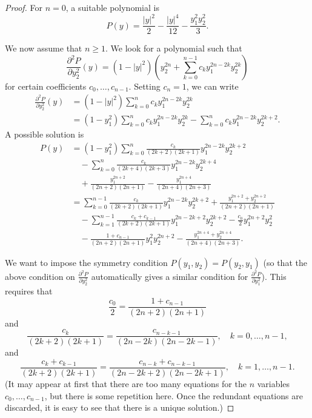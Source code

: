 \documentclass[a4paper]{article}
\theoremstyle{definition}
\theoremstyle{remark}
\begin{document}
\begin{proof}
For $n = 0$, a suitable polynomial is
\[
P(y) = \frac{|y|^2}{2} - \frac{|y|^4}{12} - \frac{y_1^2 y_2^2}{3}.
\]

We now assume that $n \ge 1$. We look for a polynomial such that
\[
\frac{\partial^2 P}{\partial y_2^2}(y) = (1 - |y|^2) \left(y_2^{2n} + \sum_{k = 0}^{n - 1} c_k y_1^{2n - 2k} y_2^{2k}\right)
\]
for certain coefficients $c_0, \dotsc, c_{n - 1}$. Setting $c_n = 1$, we
can write
\[
\begin{split}
\frac{\partial^2 P}{\partial y_2^2}(y) & = (1 - |y|^2) \sum_{k = 0}^n c_k y_1^{2n - 2k} y_2^{2k} \\
& = (1 - y_1^2) \sum_{k = 0}^n c_k y_1^{2n - 2k} y_2^{2k} - \sum_{k = 0}^n c_k y_1^{2n - 2k} y_2^{2k + 2}.
\end{split}
\]
A possible solution is
\[
\begin{split}
P(y) & = (1 - y_1^2) \sum_{k = 0}^n \frac{c_k}{(2k + 2)(2k + 1)} y_1^{2n - 2k} y_2^{2k + 2} \\
& \quad - \sum_{k = 0}^n \frac{c_k}{(2k + 4)(2k + 3)} y_1^{2n - 2k} y_2^{2k + 4} \\
& \quad + \frac{y_1^{2n + 2}}{(2n + 2)(2n + 1)} - \frac{y_1^{2n + 4}}{(2n + 4)(2n + 3)} \\
& = \sum_{k = 0}^{n - 1} \frac{c_k}{(2k + 2)(2k + 1)} y_1^{2n - 2k} y_2^{2k + 2} + \frac{y_1^{2n + 2} + y_2^{2n + 2}}{(2n + 2)(2n + 1)} \\
& \quad - \sum_{k = 1}^{n - 1} \frac{c_k + c_{k - 1}}{(2k + 2)(2k + 1)} y_1^{2n - 2k + 2} y_2^{2k + 2} - \frac{c_0}{2} y_1^{2n + 2} y_2^2 \\
& \quad - \frac{1 + c_{n - 1}}{(2n + 2)(2n + 1)} y_1^2 y_2^{2n + 2} - \frac{y_1^{2n + 4} + y_2^{2n + 4}}{(2n + 4)(2n + 3)}.
\end{split}
\]

We want to impose the symmetry condition $P(y_1, y_2) = P(y_2, y_1)$
(so that the above condition on $\frac{\partial^2 P}{\partial y_2^2}$
automatically gives a similar condition for
$\frac{\partial^2 P}{\partial y_1^2}$). This requires that
\begin{equation} \label{eq:coefficients1}
\frac{c_0}{2} = \frac{1 + c_{n - 1}}{(2n + 2)(2n + 1)}
\end{equation}
and
\begin{equation} \label{eq:coefficients2}
\frac{c_k}{(2k + 2)(2k + 1)} = \frac{c_{n - k - 1}}{(2n - 2k)(2n - 2k - 1)}, \quad k = 0, \dotsc, n - 1,
\end{equation}
and
\begin{equation} \label{eq:coefficients3}
\frac{c_k + c_{k - 1}}{(2k + 2)(2k + 1)} = \frac{c_{n - k} + c_{n - k - 1}}{(2n - 2k + 2)(2n - 2k + 1)}, \quad k = 1, \dotsc, n - 1.
\end{equation}
(It may appear at first that there are too many equations for the $n$ variables
$c_0, \dotsc, c_{n - 1}$, but there is some repetition here.
Once the redundant equations are discarded, it is easy to see that there
is a unique solution.)


\end{proof}
\end{document}
